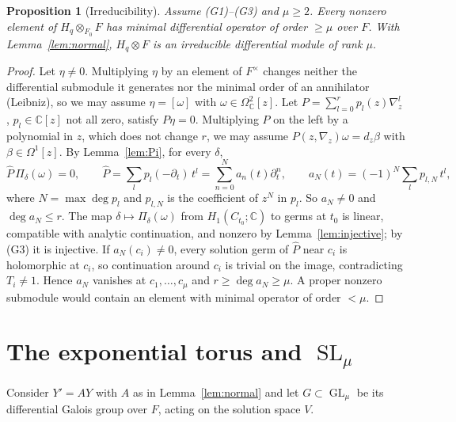 \documentclass[11pt]{article}
\numberwithin{equation}{section}
\newtheorem{proposition}[theorem]{Proposition}
\theoremstyle{definition}
\theoremstyle{remark}
\newcommand{\C}{\mathbb C}\newcommand{\Q}{\mathbb Q}\newcommand{\R}{\mathbb R}\newcommand{\Z}{\mathbb Z}
\newcommand{\SL}{\operatorname{SL}}\newcommand{\GL}{\operatorname{GL}}\newcommand{\PGL}{\operatorname{PGL}}
\newcommand{\Hq}{H_q}
\begin{document}
\begin{proposition}[Irreducibility]\label{prop:irred}
Assume \textup{(G1)--(G3)} and $\mu\ge2$. Every nonzero element of
$\Hq\otimes_{F_0}F$ has minimal differential operator of order $\ge\mu$ over
$F$. With Lemma~\ref{lem:normal}, $\Hq\otimes F$ is an irreducible differential
module of rank $\mu$.
\end{proposition}
\begin{proof}
Let $\eta\ne0$. Multiplying $\eta$ by an element of $F^\times$ changes neither
the differential submodule it generates nor the minimal order of an
annihilator (Leibniz), so we may assume $\eta=[\omega]$ with
$\omega\in\Omega^2_\C[z]$. Let
$P=\sum_{l=0}^rp_l(z)\nabla_z^l$, $p_l\in\C[z]$ not all zero, satisfy
$P\eta=0$. Multiplying $P$ on the left by a polynomial in $z$, which does not change $r$,
we may assume $P(z,\nabla_z)\omega=d_z\beta$ with $\beta\in\Omega^1[z]$. By
Lemma~\ref{lem:Pi}, for every $\delta$,
\[
 \widehat P\,\Pi_\delta(\omega)=0,\qquad
 \widehat P=\sum_lp_l(-\partial_t)\,t^l=\sum_{n=0}^Na_n(t)\partial_t^n,
 \qquad a_N(t)=(-1)^N\sum_l p_{l,N}\,t^l,
\]
where $N=\max\deg p_l$ and $p_{l,N}$ is the coefficient of $z^N$ in $p_l$. So
$a_N\ne0$ and $\deg a_N\le r$.
The map $\delta\mapsto\Pi_\delta(\omega)$ from $H_1(C_{t_0};\C)$ to germs at $t_0$
is linear, compatible with analytic continuation, and nonzero by
Lemma~\ref{lem:injective}; by (G3) it is injective. If $a_N(c_i)\ne0$, every
solution germ of $\widehat P$ near $c_i$ is holomorphic at $c_i$, so
continuation around $c_i$ is trivial on the image, contradicting $T_i\ne1$.
Hence $a_N$ vanishes at $c_1,\dots,c_\mu$ and $r\ge\deg a_N\ge\mu$. A proper
nonzero submodule would contain an element with minimal operator of order
$<\mu$.
\end{proof}

\section{The exponential torus and \texorpdfstring{$\SL_\mu$}{SL}}

Consider $Y'=AY$ with $A$ as in Lemma~\ref{lem:normal} and let $G\subset\GL_\mu$
be its differential Galois group over $F$, acting on the solution space $V$.
\end{document}
